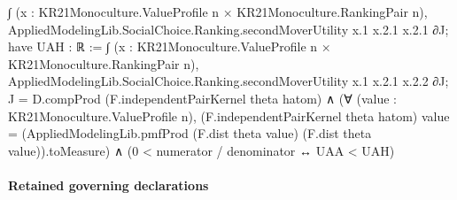 \documentclass[10pt]{article}
\begin{document}
\begin{ReviewVerbatim}
              ∫ (x : KR21Monoculture.ValueProfile n × KR21Monoculture.RankingPair n),
                AppliedModelingLib.SocialChoice.Ranking.secondMoverUtility x.1 x.2.1 x.2.1 ∂J;
            have UAH : ℝ :=
              ∫ (x : KR21Monoculture.ValueProfile n × KR21Monoculture.RankingPair n),
                AppliedModelingLib.SocialChoice.Ranking.secondMoverUtility x.1 x.2.1 x.2.2 ∂J;
            J = D.compProd (F.independentPairKernel theta hatom) ∧
              (∀ (value : KR21Monoculture.ValueProfile n),
                  (F.independentPairKernel theta hatom) value =
                    (AppliedModelingLib.pmfProd (F.dist theta value) (F.dist theta value)).toMeasure) ∧
                (0 < numerator / denominator ↔ UAA < UAH)
\end{ReviewVerbatim}

\paragraph{Retained governing declarations}
\end{document}
